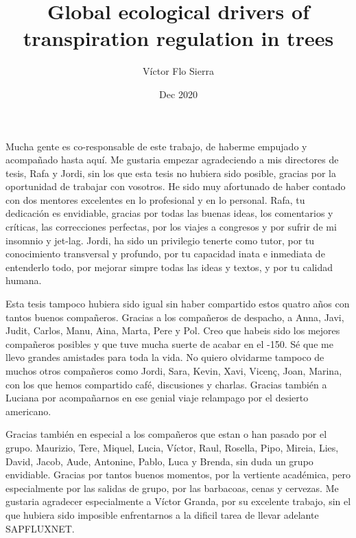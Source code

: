 \documentclass[11pt,twoside]{reedthesis}
\title{Global ecological drivers of transpiration regulation in trees}
\author{Víctor Flo Sierra}
\date{Dec 2020}
\begin{document}
  \maketitle

\frontmatter %
\pagestyle{empty} %
  \begin{acknowledgements}
    \setlength{\parindent}{30pt} Mucha gente es co-responsable de este
    trabajo, de haberme empujado y acompañado hasta aquí. Me gustaria
    empezar agradeciendo a mis directores de tesis, Rafa y Jordi, sin los
    que esta tesis no hubiera sido posible, gracias por la oportunidad de
    trabajar con vosotros. He sido muy afortunado de haber contado con dos
    mentores excelentes en lo profesional y en lo personal. Rafa, tu
    dedicación es envidiable, gracias por todas las buenas ideas, los
    comentarios y críticas, las correcciones perfectas, por los viajes a
    congresos y por sufrir de mi insomnio y jet-lag. Jordi, ha sido un
    privilegio tenerte como tutor, por tu conocimiento transversal y
    profundo, por tu capacidad inata e inmediata de entenderlo todo, por
    mejorar simpre todas las ideas y textos, y por tu calidad humana.\par
    Esta tesis tampoco hubiera sido igual sin haber compartido estos quatro
    años con tantos buenos compañeros. Gracias a los compañeros de despacho,
    a Anna, Javi, Judit, Carlos, Manu, Aina, Marta, Pere y Pol. Creo que
    habeis sido los mejores compañeros posibles y que tuve mucha suerte de
    acabar en el -150. Sé que me llevo grandes amistades para toda la vida.
    No quiero olvidarme tampoco de muchos otros compañeros como Jordi, Sara,
    Kevin, Xavi, Vicenç, Joan, Marina, con los que hemos compartido café,
    discusiones y charlas. Gracias también a Luciana por acompañarnos en ese
    genial viaje relampago por el desierto americano.\par
    Gracias también en especial a los compañeros que estan o han pasado por
    el grupo. Maurizio, Tere, Miquel, Lucia, Víctor, Raul, Rosella, Pipo,
    Mireia, Lies, David, Jacob, Aude, Antonine, Pablo, Luca y Brenda, sin
    duda un grupo envidiable. Gracias por tantos buenos momentos, por la
    vertiente académica, pero especialmente por las salidas de grupo, por
    las barbacoas, cenas y cervezas. Me gustaria agradecer especialmente a
    Víctor Granda, por su excelente trabajo, sin el que hubiera sido
    imposible enfrentarnos a la dificil tarea de llevar adelante SAPFLUXNET.

\end{acknowledgements}
\end{document}
